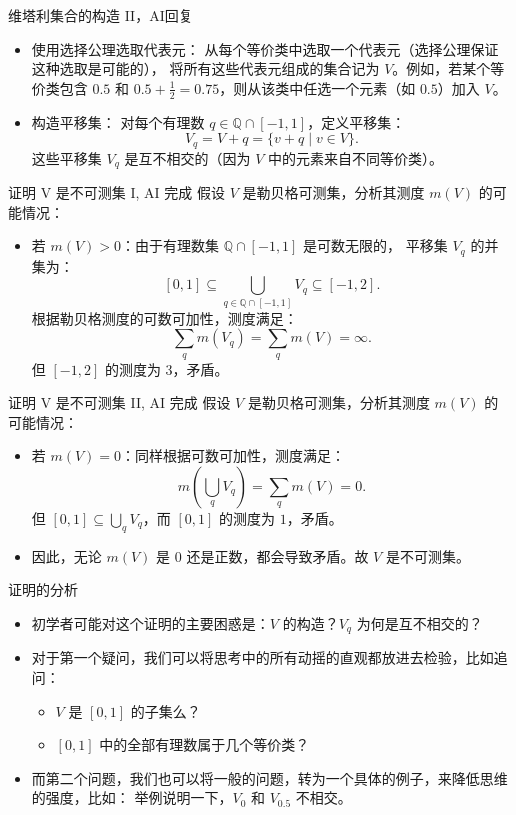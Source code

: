 \documentclass{beamer}
\begin{document}
\begin{frame}{维塔利集合的构造 II，AI回复}
  \begin{itemize}
   \item 使用选择公理选取代表元： 从每个等价类中选取一个代表元（选择公理保证这种选取是可能的），
   将所有这些代表元组成的集合记为 $V$。例如，若某个等价类包含 $0.5$ 
   和 $0.5 + \frac{1}{2} = 0.75$，则从该类中任选一个元素（如 $0.5$）加入 $V$。
    \item 构造平移集： 对每个有理数 $q \in \mathbb{Q} \cap [-1, 1]$，定义平移集：
   $$
   V_q = V + q = \{v + q \mid v \in V\}.
   $$
这些平移集 $V_q$ 是互不相交的（因为 $V$ 中的元素来自不同等价类）。  
  \end{itemize}
\end{frame}

\begin{frame}{证明 V 是不可测集 I, AI 完成}
假设 $V$ 是勒贝格可测集，分析其测度 $m(V)$ 的可能情况：
\begin{itemize}
  \item 若 $m(V) > 0$：由于有理数集 $\mathbb{Q} \cap [-1, 1]$ 是可数无限的，
  平移集 $V_q$ 的并集为：
     $$
     [0, 1] \subseteq \bigcup_{q \in \mathbb{Q} \cap [-1, 1]} V_q \subseteq [-1, 2].
     $$
根据勒贝格测度的可数可加性，测度满足：
     $$
     \sum_{q} m(V_q) = \sum_{q} m(V) = \infty.
     $$
但 $[-1, 2]$ 的测度为 $3$，矛盾。
\end{itemize}
\end{frame}

\begin{frame}{证明 V 是不可测集 II, AI 完成}
假设 $V$ 是勒贝格可测集，分析其测度 $m(V)$ 的可能情况：
\begin{itemize}
\item 若 $m(V) = 0$：同样根据可数可加性，测度满足：
     $$
     m\left(\bigcup_{q} V_q\right) = \sum_{q} m(V) = 0.
     $$
但 $[0, 1] \subseteq \bigcup_{q} V_q$，而 $[0, 1]$ 的测度为 $1$，矛盾。
\item 因此，无论 $m(V)$ 是 $0$ 还是正数，都会导致矛盾。故 $V$ 是不可测集。  
\end{itemize}
\end{frame}

\begin{frame}{证明的分析}
  \begin{itemize}
    \item<1-> 初学者可能对这个证明的主要困惑是：$V$ 的构造？$V_q$ 为何是互不相交的？
    \item<2-> 对于第一个疑问，我们可以将思考中的所有动摇的直观都放进去检验，比如追问：
    \begin{itemize}
      \item<3-> $V$ 是 $[0, 1]$ 的子集么？
      \item<4-> $[0, 1]$ 中的全部有理数属于几个等价类？ 
    \end{itemize}
    \item<5-> 而第二个问题，我们也可以将一般的问题，转为一个具体的例子，来降低思维的强度，比如：
    举例说明一下，$V_0$ 和 $V_0.5$ 不相交。
  \end{itemize}
\end{frame}
\end{document}
